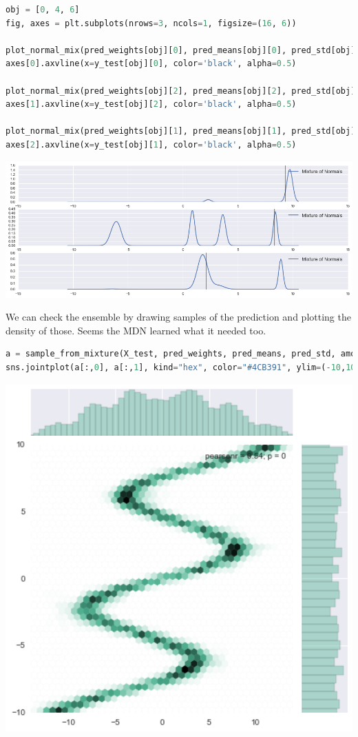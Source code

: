 \begin{lstlisting}[language=Python]
obj = [0, 4, 6]
fig, axes = plt.subplots(nrows=3, ncols=1, figsize=(16, 6))

plot_normal_mix(pred_weights[obj][0], pred_means[obj][0], pred_std[obj][0], axes[0], comp=False)
axes[0].axvline(x=y_test[obj][0], color='black', alpha=0.5)

plot_normal_mix(pred_weights[obj][2], pred_means[obj][2], pred_std[obj][2], axes[1], comp=False)
axes[1].axvline(x=y_test[obj][2], color='black', alpha=0.5)

plot_normal_mix(pred_weights[obj][1], pred_means[obj][1], pred_std[obj][1], axes[2], comp=False)
axes[2].axvline(x=y_test[obj][1], color='black', alpha=0.5)
\end{lstlisting}

\includegraphics[width=700px]{images/mdn-fig2.png}

We can check the ensemble by drawing samples of the prediction and plotting the density of those.
Seems the MDN learned what it needed too.

\begin{lstlisting}[language=Python]
a = sample_from_mixture(X_test, pred_weights, pred_means, pred_std, amount=len(X_test))
sns.jointplot(a[:,0], a[:,1], kind="hex", color="#4CB391", ylim=(-10,10), xlim=(-14,14))
\end{lstlisting}

\includegraphics[width=700px]{images/mdn-fig3.png}
